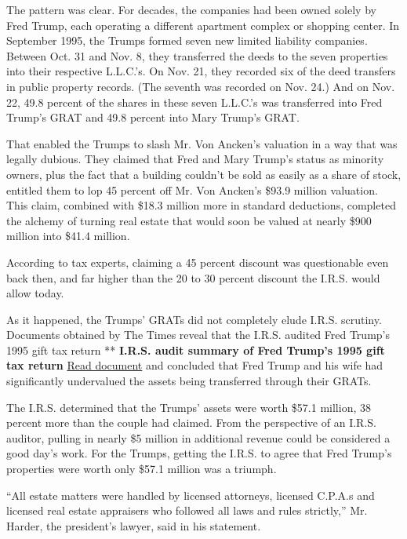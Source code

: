 The pattern was clear. For decades, the companies had been owned solely
by Fred Trump, each operating a different apartment complex or shopping
center. In September 1995, the Trumps formed seven new limited liability
companies. Between Oct. 31 and Nov. 8, they transferred the deeds to the
seven properties into their respective L.L.C.'s. On Nov. 21, they
recorded six of the deed transfers in public property records. (The
seventh was recorded on Nov. 24.) And on Nov. 22, 49.8 percent of the
shares in these seven L.L.C.'s was transferred into Fred Trump's GRAT
and 49.8 percent into Mary Trump's GRAT.

That enabled the Trumps to slash Mr. Von Ancken's valuation in a way
that was legally dubious. They claimed that Fred and Mary Trump's status
as minority owners, plus the fact that a building couldn't be sold as
easily as a share of stock, entitled them to lop 45 percent off Mr. Von
Ancken's \$93.9 million valuation. This claim, combined with \$18.3
million more in standard deductions, completed the alchemy of turning
real estate that would soon be valued at nearly \$900 million into
\$41.4 million.

According to tax experts, claiming a 45 percent discount was
questionable even back then, and far higher than the 20 to 30 percent
discount the I.R.S. would allow today.

As it happened, the Trumps' GRATs did not completely elude I.R.S.
scrutiny. Documents obtained by The Times reveal that the I.R.S. audited
Fred Trump's 1995 gift tax return ** \textbf{I.R.S. audit summary of
Fred Trump's 1995 gift tax return}
\href{https://int.nyt.com/data/documenthelper/142-fct-1995-federal-gift/9c5e1010469adaac01a2/optimized/full.pdf\#page=1}{Read
document} and concluded that Fred Trump and his wife had significantly
undervalued the assets being transferred through their GRATs.

The I.R.S. determined that the Trumps' assets were worth \$57.1 million,
38 percent more than the couple had claimed. From the perspective of an
I.R.S. auditor, pulling in nearly \$5 million in additional revenue
could be considered a good day's work. For the Trumps, getting the
I.R.S. to agree that Fred Trump's properties were worth only \$57.1
million was a triumph.

``All estate matters were handled by licensed attorneys, licensed
C.P.A.s and licensed real estate appraisers who followed all laws and
rules strictly,'' Mr. Harder, the president's lawyer, said in his
statement.

